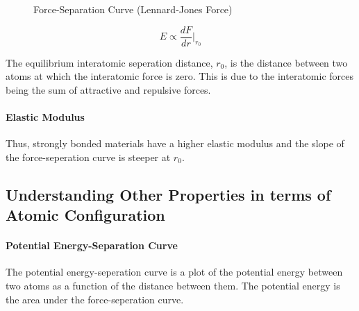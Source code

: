 \documentclass[11pt]{report}
\begin{document}
\begin{figure}[h]
    \centering
    \caption{Force-Separation Curve (Lennard-Jones Force)}
    \label{fig:force-separation}
\end{figure}
\begin{equation}
    E \propto \frac{dF}{dr} \Bigg|_{r_0}
\end{equation}
\begin{definition}
The equilibrium interatomic seperation distance, $r_0$, is the distance between two atoms at which the interatomic force is zero. This is due to the interatomic forces being the sum of attractive and repulsive forces.
\end{definition}
\paragraph{Elastic Modulus} Thus, strongly bonded materials have a higher elastic modulus and the slope of the force-seperation curve is steeper at $r_0$.
\subsection{Understanding Other Properties in terms of Atomic Configuration}
\paragraph{Potential Energy-Separation Curve} The potential energy-seperation curve is a plot of the potential energy between two atoms as a function of the distance between them. The potential energy is the area under the force-seperation curve.
\end{document}
